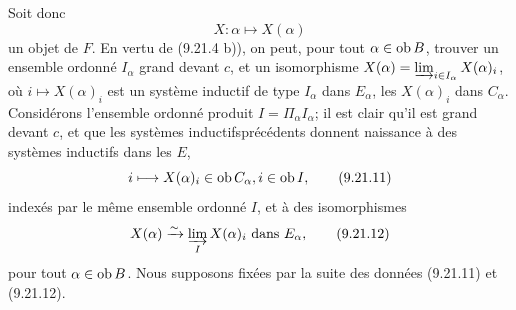 \documentclass[10pt]{../fichiers-configuration-latex/smfart}
\begin{document}
Soit donc
$$
X:\alpha\longmapsto X(\alpha)
$$
un objet de $F$. En vertu de (9.21.4 b)), on peut, pour tout
$\alpha\in \operatorname{ob} B$, trouver un ensemble ordonné $I_{\alpha}$ grand
devant $c$, et un isomorphisme $X(\alpha)=\varinjlim_{i\in
I_{\alpha}} X(\alpha)_i$, où $i\mapsto X(\alpha)_i$ est un système
inductif de type $I_{\alpha}$ dans $E_{\alpha}$, les $X(\alpha)_i$
dans $C_{\alpha}$. Considérons l'ensemble ordonné produit
$I=\Pi_{\alpha} I_{\alpha}$; il est clair qu'il est grand devant
$c$, et que les systèmes inductifs\pageoriginale précédents donnent
naissance à des systèmes inductifs dans les $E$,
\begin{equation}
i\longmapsto X(\alpha)_i\in \operatorname{ob} C_{\alpha}, i\in \operatorname{ob}
I{},\tag{9.21.11}
\end{equation}
indexés par le même ensemble ordonné $I$, et à des isomorphismes
\begin{equation}
X(\alpha)\xrightarrow{\sim}\varinjlim_I X(\alpha)_i\mbox{ dans }
E_{\alpha}{},\tag{9.21.12}
\end{equation}
pour tout $\alpha\in \operatorname{ob} B$. Nous supposons fixées par la suite des
données (9.21.11) et (9.21.12).
\end{document}
